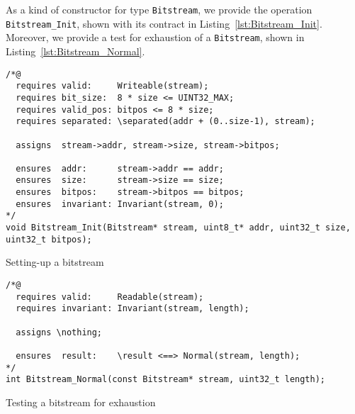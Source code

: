 As a kind of constructor for type
\lstinline{Bitstream}, we provide the operation \lstinline{Bitstream_Init},
shown with its contract in Listing~\ref{lst:Bitstream_Init}.
%
Moreover, we provide a test for exhaustion of a \lstinline{Bitstream},
shown in Listing~\ref{lst:Bitstream_Normal}.




\begin{listing}[hbt]
\begin{minipage}{0.99\textwidth}
\begin{lstlisting}[style=acsl-block]
/*@
  requires valid:     Writeable(stream);
  requires bit_size:  8 * size <= UINT32_MAX;
  requires valid_pos: bitpos <= 8 * size;
  requires separated: \separated(addr + (0..size-1), stream);

  assigns  stream->addr, stream->size, stream->bitpos;

  ensures  addr:      stream->addr == addr;
  ensures  size:      stream->size == size;
  ensures  bitpos:    stream->bitpos == bitpos;
  ensures  invariant: Invariant(stream, 0);
*/
void Bitstream_Init(Bitstream* stream, uint8_t* addr, uint32_t size, uint32_t bitpos);
\end{lstlisting}
\end{minipage}
\caption{\label{lst:Bitstream_Init}Setting-up a bitstream}
\end{listing}



\begin{listing}[hbt]
\begin{minipage}{0.99\textwidth}
\begin{lstlisting}[style=acsl-block]
/*@
  requires valid:     Readable(stream);
  requires invariant: Invariant(stream, length);

  assigns \nothing;

  ensures  result:    \result <==> Normal(stream, length);
*/
int Bitstream_Normal(const Bitstream* stream, uint32_t length);
\end{lstlisting}
\end{minipage}
\caption{\label{lst:Bitstream_Normal}Testing a bitstream for exhaustion}
\end{listing}





